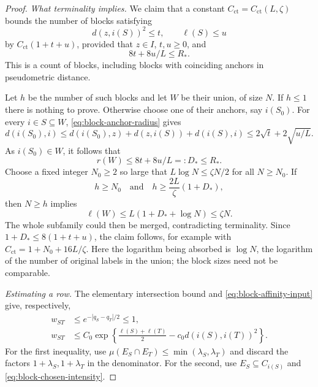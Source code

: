 \begin{proof}
\emph{What terminality implies.}
We claim that a constant $C_{\mathrm{ct}}=C_{\mathrm{ct}}(L,\zeta)$
bounds the number of blocks satisfying
\begin{equation}\label{eq:block-count-conditions}
 d(z,i(S))^2\le t,\qquad \ell(S)\le u
\end{equation}
by $C_{\mathrm{ct}}(1+t+u)$, provided that $z\in I$, $t,u\ge0$, and
\begin{equation}\label{eq:block-count-radius}
 8t+8u/L\le R_*.
\end{equation}
This is a count of blocks, including blocks with coinciding anchors in
pseudometric distance.

Let $h$ be the number of such blocks and let $W$ be their union, of size
$N$.  If $h\le1$ there is nothing to prove.
Otherwise choose one of their anchors, say $i(S_0)$.
For every $i\in S\subseteq W$, \eqref{eq:block-anchor-radius} gives
\[
 d(i(S_0),i)
 \le d(i(S_0),z)+d(z,i(S))+d(i(S),i)
 \le2\sqrt t+2\sqrt{u/L}.
\]
As $i(S_0)\in W$, it follows that
\[
 r(W)\le8t+8u/L=:D_*\le R_*.
\]
Choose a fixed integer $N_0\ge2$ so large that
$L\log N\le\zeta N/2$ for all $N\ge N_0$.
If
\[
 h\ge N_0\quad\text{and}\quad
 h\ge\frac{2L}{\zeta}(1+D_*),
\]
then $N\ge h$ implies
\[
 \ell(W)\le L(1+D_*+\log N)\le\zeta N.
\]
The whole subfamily could then be merged, contradicting terminality.
Since $1+D_*\le8(1+t+u)$, the claim follows, for example with
$C_{\mathrm{ct}}=1+N_0+16L/\zeta$.
Here the logarithm being absorbed is $\log N$, the logarithm of the
number of original labels in the union; the block sizes need not be
comparable.

\emph{Estimating a row.}
The elementary intersection bound and \eqref{eq:block-affinity-input}
give, respectively,
\begin{align}
 w_{ST}&\le e^{-|q_S-q_T|/2}\le1,
 \label{eq:block-weight-trivial}\\
 w_{ST}&\le C_0\exp\left\{
   \frac{\ell(S)+\ell(T)}2-c_0d(i(S),i(T))^2\right\}.
 \label{eq:block-weight-affinity}
\end{align}
For the first inequality, use
$\mu(E_S\cap E_T)\le\min(\lambda_S,\lambda_T)$ and discard the
factors $1+\lambda_S,1+\lambda_T$ in the denominator.
For the second, use $E_S\subseteq C_{i(S)}$ and
\eqref{eq:block-chosen-intensity}.


\end{proof}
